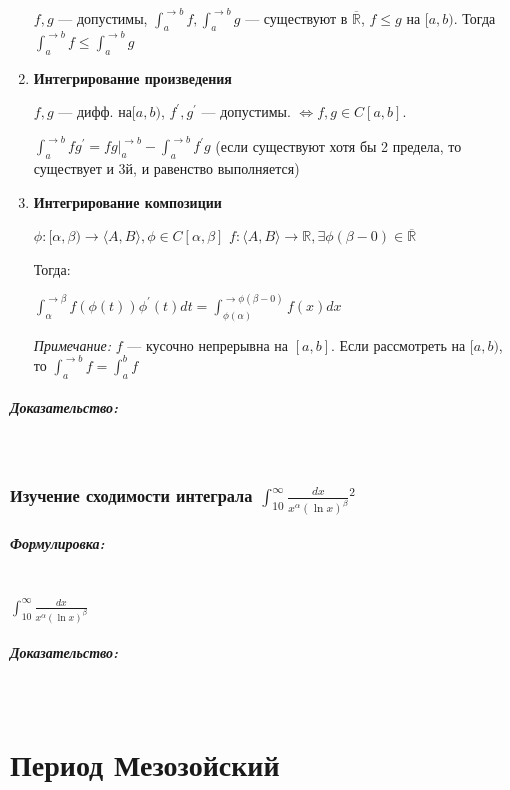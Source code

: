 \documentclass{article}
\let\vanillasubparagraph\subparagraph
\renewcommand{\subparagraph}[1]{\vanillasubparagraph{#1}\mbox{}\\}
\begin{document}
\begin{enumerate}
    $f, g$ --- допустимы, $\int_a^{\rightarrow b}f, \int_a^{\rightarrow b}g$ --- существуют в $\overline{\mathbb{R}}$, $f \le g$ на $[a, b)$. Тогда $\int_a^{\rightarrow b}f \le \int_a^{\rightarrow b}g$
    
    \item \textbf{Интегрирование произведения}
    
    $f, g$ --- дифф. на$[a, b)$, $f^\prime, g^\prime $ --- допустимы. $\Leftrightarrow f, g \in C[a, b]$.
    
    $\int_a^{\rightarrow b}{fg^\prime} = fg|_a^{\rightarrow b} - \int_a^{\rightarrow b}{f^\prime g}$ (если существуют хотя бы 2 предела, то существует и 3й, и равенство выполняется)
    
    \item \textbf{Интегрирование композиции}
    
    $\phi: [\alpha, \beta) \rightarrow \langle A, B \rangle, \phi \in C[\alpha, \beta]$ 
    $f: \langle A, B \rangle \rightarrow \mathbb{R}, \exists \phi(\beta - 0) \in \overline{\mathbb{R}}$
    
    Тогда:
    
    $\int_\alpha^{\rightarrow \beta}{f(\phi(t))\phi^\prime(t)dt} =
     \int_{\phi(\alpha)}^{\rightarrow \phi(\beta - 0)}{f(x)dx}$
     
     \textit{Примечание:}
     $f$ --- кусочно непрерывна на $[a, b]$. Если рассмотреть на $[a, b)$, то $\int_a^{\rightarrow b}{f} = \int_a^b{f}$
    

\end{enumerate}

\subparagraph{Доказательство:}




\subsubsection{Изучение сходимости интеграла \texorpdfstring{$\int_{10}^\infty \frac{dx}{x^\alpha (\ln x)^\beta}$}{int [10, inf] dx/x\^a(ln x)\^b}\texorpdfstring{$^2$}{}}

\subparagraph{Формулировка:}

$\int_{10}^\infty \frac{dx}{x^\alpha (\ln x)^\beta}$

\subparagraph{Доказательство:}



\section{Период Мезозойский}
\end{document}
